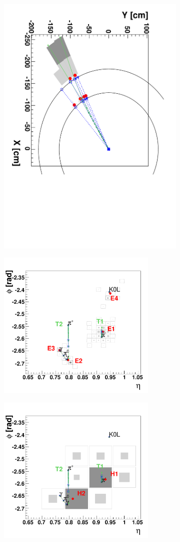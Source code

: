 \begin{figure}[tbh]
\centering
\begin{subfigure}{0.45\textwidth}
\centering
\includegraphics[width=4in]{figures/PFa.pdf}
\caption{}
\end{subfigure}
\begin{subfigure}{0.45\textwidth}
\centering
\includegraphics[width=3in]{figures/PFb.pdf}
\caption{}
\end{subfigure}
\begin{subfigure}{0.45\textwidth}
\centering
\includegraphics[width=3in]{figures/PFc.pdf}

\end{subfigure}
\end{figure}
